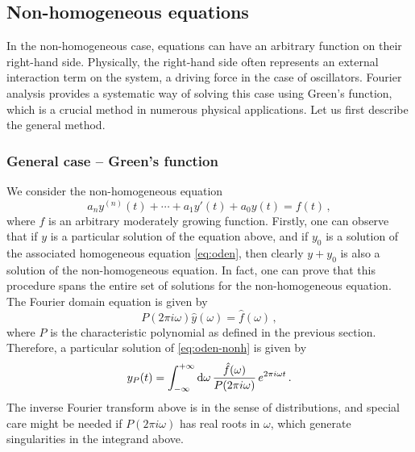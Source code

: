 \subsection{Non-homogeneous equations}
In the non-homogeneous case, equations can have an arbitrary function on their right-hand
side. Physically, the right-hand side often represents an external interaction term on
the system, \eg a driving force in the case of oscillators. Fourier analysis provides a
systematic way of solving this case using Green's function, which is a crucial method in
numerous physical applications. Let us first describe the general method.
\subsubsection{General case -- Green's function}
We consider the non-homogeneous equation
\begin{equation}
  a_ny^{(n)}(t)+\cdots+a_1y'(t)+a_0y(t)=f(t)\,,\label{eq:oden-nonh}
\end{equation}
where $f$ is an arbitrary moderately growing function. Firstly, one can observe that if
$y$ is a particular solution of the equation above, and if $y_0$ is a solution of the
associated homogeneous equation \cref{eq:oden}, then clearly $y+y_0$ is also a solution of
the non-homogeneous equation. In fact, one can prove that this procedure spans the entire
set of solutions for the non-homogeneous equation. The Fourier domain equation is given by
\begin{equation}
  P(2\pi i\omega)\hat{y}(\omega)=\hat{f}(\omega)\,,
\end{equation}
where $P$ is the characteristic polynomial as defined in the previous section. Therefore,
a particular solution of \cref{eq:oden-nonh} is given by
\begin{equation}
  y_P(t)=\int_{-\infty}^{+\infty}\mathrm{d}{\omega}\,\frac{\hat{f}(\omega)}{P(2\pi i\omega)}\,e^{2\pi i \omega t}\,.
  \label{eq:oden-part}
\end{equation}
The inverse Fourier transform above is in the sense of distributions, and special care
might be needed if $P(2\pi i\omega)$ has real roots in $\omega$, which generate
singularities in the integrand above.

